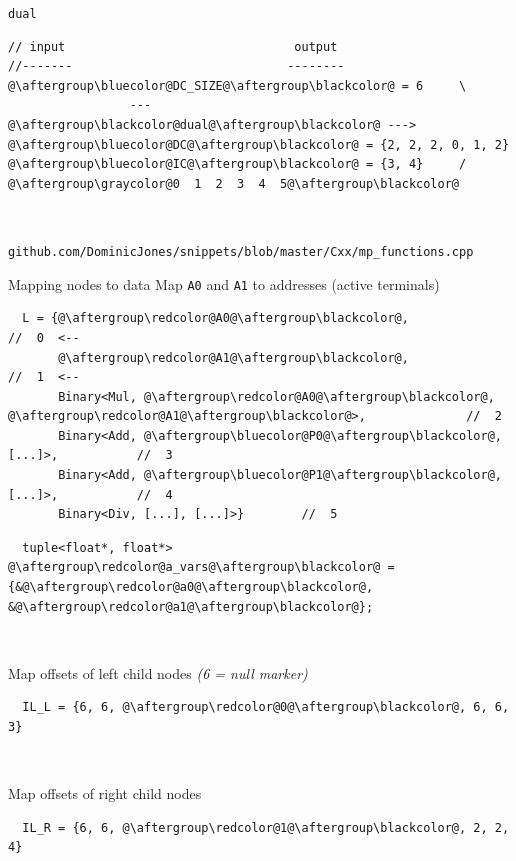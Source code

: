 \documentclass[xcolor=dvipsnames]{beamer}
\begin{document}
\begin{frame}[fragile]{\texttt{dual}}
\begin{lstlisting}
// input                                output
//-------                              --------
@\aftergroup\bluecolor@DC_SIZE@\aftergroup\blackcolor@ = 6     \
                 --- @\aftergroup\blackcolor@dual@\aftergroup\blackcolor@ --->    @\aftergroup\bluecolor@DC@\aftergroup\blackcolor@ = {2, 2, 2, 0, 1, 2}
@\aftergroup\bluecolor@IC@\aftergroup\blackcolor@ = {3, 4}     /                       @\aftergroup\graycolor@0  1  2  3  4  5@\aftergroup\blackcolor@
\end{lstlisting}

~

\vspace{5mm}
\footnotesize{\texttt{github.com/DominicJones/snippets/blob/master/Cxx/mp\_functions.cpp}}
\end{frame}


\begin{frame}[fragile]{Mapping nodes to data}
Map {\color{red}\texttt{A0}} and {\color{red}\texttt{A1}} to addresses (active terminals)
\begin{lstlisting}
  L = {@\aftergroup\redcolor@A0@\aftergroup\blackcolor@,                               //  0  <--
       @\aftergroup\redcolor@A1@\aftergroup\blackcolor@,                               //  1  <--
       Binary<Mul, @\aftergroup\redcolor@A0@\aftergroup\blackcolor@, @\aftergroup\redcolor@A1@\aftergroup\blackcolor@>,              //  2
       Binary<Add, @\aftergroup\bluecolor@P0@\aftergroup\blackcolor@, [...]>,           //  3
       Binary<Add, @\aftergroup\bluecolor@P1@\aftergroup\blackcolor@, [...]>,           //  4
       Binary<Div, [...], [...]>}        //  5
\end{lstlisting}
\begin{lstlisting}
  tuple<float*, float*> @\aftergroup\redcolor@a_vars@\aftergroup\blackcolor@ = {&@\aftergroup\redcolor@a0@\aftergroup\blackcolor@, &@\aftergroup\redcolor@a1@\aftergroup\blackcolor@};
\end{lstlisting}


~

Map offsets of left child nodes \emph{(6 = null marker)}
\begin{lstlisting}
  IL_L = {6, 6, @\aftergroup\redcolor@0@\aftergroup\blackcolor@, 6, 6, 3}
\end{lstlisting}

~

Map offsets of right child nodes
\begin{lstlisting}
  IL_R = {6, 6, @\aftergroup\redcolor@1@\aftergroup\blackcolor@, 2, 2, 4}
\end{lstlisting}
\end{frame}
\end{document}

